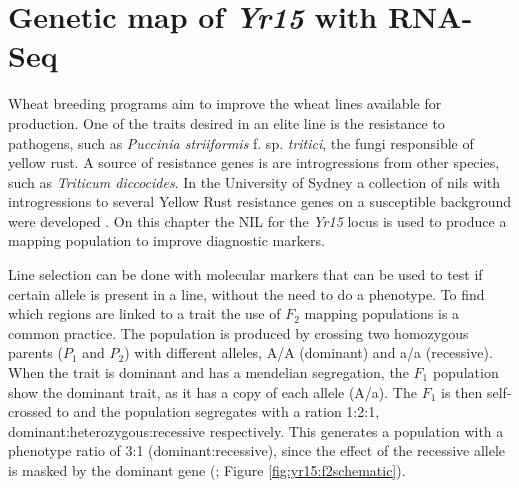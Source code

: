 
\chapter{Genetic map of \textit{Yr15} with RNA-Seq}
\label{yr15}
 

Wheat breeding programs aim to improve the wheat lines available for production.
One of the traits desired in an elite line is the resistance to pathogens, such as \textit{Puccinia striiformis} f. sp.  \textit{tritici}, the fungi responsible of yellow rust.
A source of resistance genes is are introgressions from other species, such as \textit{Triticum diccocides}. 
In the University of Sydney a collection of \glspl{nil} with introgressions to several Yellow Rust resistance genes on a susceptible background were developed \citep{Wellings1998}. 
On this chapter the NIL for the \textit{Yr15} locus is used to produce a mapping population to improve diagnostic markers. 


Line selection can be done with molecular markers that can be used to test if certain allele is present in a line, without the need to do a phenotype.
To find which regions are linked to a trait the use of $F_{2}$ mapping populations is a common practice.
The population is produced by crossing two homozygous parents ($P_1$ and $P_{2}$) with different alleles, A/A (dominant) and a/a (recessive).
When the trait is dominant and has a mendelian segregation, the $F_1$ population show the dominant trait, as it has a copy of each allele (A/a). 
The $F_1$ is then self-crossed to and the population segregates with a ration 1:2:1, dominant:heterozygous:recessive respectively.
This generates a population with a phenotype ratio of 3:1 (dominant:recessive), since the effect of the recessive allele is masked by the dominant gene (\citealt{VanOoijen2013}; Figure \ref{fig:yr15:f2schematic}).  

